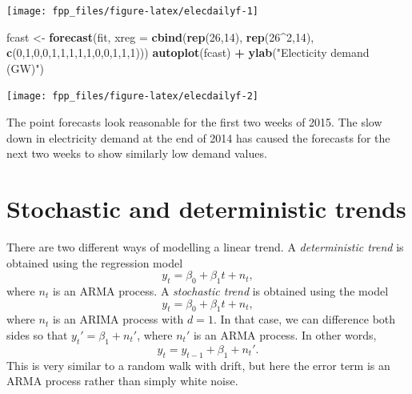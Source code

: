 \documentclass[]{book}
\newenvironment{Shaded}{\begin{snugshade}}{\end{snugshade}}
\newcommand{\DataTypeTok}[1]{\textcolor[rgb]{0.13,0.29,0.53}{#1}}
\newcommand{\DecValTok}[1]{\textcolor[rgb]{0.00,0.00,0.81}{#1}}
\newcommand{\KeywordTok}[1]{\textcolor[rgb]{0.13,0.29,0.53}{\textbf{#1}}}
\newcommand{\NormalTok}[1]{#1}
\newcommand{\OperatorTok}[1]{\textcolor[rgb]{0.81,0.36,0.00}{\textbf{#1}}}
\newcommand{\StringTok}[1]{\textcolor[rgb]{0.31,0.60,0.02}{#1}}
\begin{document}
\begin{center}\texttt{[image: fpp\_files/figure-latex/elecdailyf-1]} \end{center}

\begin{Shaded}
\begin{Highlighting}[]

\NormalTok{fcast <-}\StringTok{ }\KeywordTok{forecast}\NormalTok{(fit, }
  \DataTypeTok{xreg =} \KeywordTok{cbind}\NormalTok{(}\KeywordTok{rep}\NormalTok{(}\DecValTok{26}\NormalTok{,}\DecValTok{14}\NormalTok{), }\KeywordTok{rep}\NormalTok{(}\DecValTok{26}\OperatorTok{^}\DecValTok{2}\NormalTok{,}\DecValTok{14}\NormalTok{), }\KeywordTok{c}\NormalTok{(}\DecValTok{0}\NormalTok{,}\DecValTok{1}\NormalTok{,}\DecValTok{0}\NormalTok{,}\DecValTok{0}\NormalTok{,}\DecValTok{1}\NormalTok{,}\DecValTok{1}\NormalTok{,}\DecValTok{1}\NormalTok{,}\DecValTok{1}\NormalTok{,}\DecValTok{1}\NormalTok{,}\DecValTok{0}\NormalTok{,}\DecValTok{0}\NormalTok{,}\DecValTok{1}\NormalTok{,}\DecValTok{1}\NormalTok{,}\DecValTok{1}\NormalTok{)))}
\KeywordTok{autoplot}\NormalTok{(fcast) }\OperatorTok{+}\StringTok{ }\KeywordTok{ylab}\NormalTok{(}\StringTok{"Electicity demand (GW)"}\NormalTok{) }
\end{Highlighting}
\end{Shaded}

\begin{center}\texttt{[image: fpp\_files/figure-latex/elecdailyf-2]} \end{center}

The point forecasts look reasonable for the first two weeks of 2015. The slow down in electricity demand at the end of 2014 has caused the forecasts for the next two weeks to show similarly low demand values.

\hypertarget{stochastic-and-deterministic-trends}{%
\section{Stochastic and deterministic trends}\label{stochastic-and-deterministic-trends}}

There are two different ways of modelling a linear trend. A \emph{deterministic trend} is obtained using the regression model
\[
  y_t = \beta_0 + \beta_1 t + n_t,
\]
where \(n_t\) is an ARMA process. A \emph{stochastic trend} is obtained using the model
\[
  y_t = \beta_0 + \beta_1 t + n_t,
\]
where \(n_t\) is an ARIMA process with \(d=1\). In that case, we can difference both sides so that \(y_t' = \beta_1 + n_t'\), where \(n_t'\) is an ARMA process. In other words,
\[
  y_t = y_{t-1} + \beta_1 + n_t'.
\]
This is very similar to a random walk with drift, but here the error term is an ARMA process rather than simply white noise.
\end{document}
